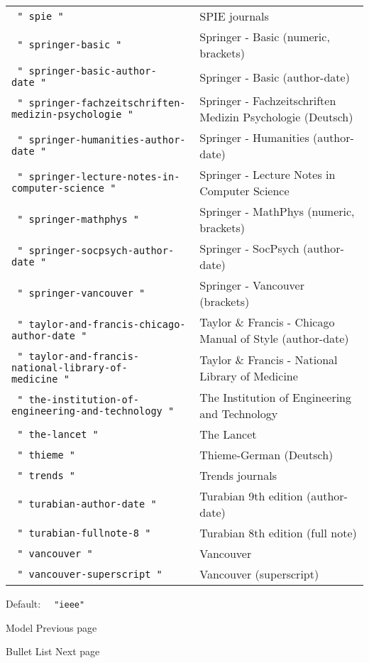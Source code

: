 \begin{longtable}[]{@{}ll@{}}
\texttt{\ "\ spie\ "\ } & SPIE journals \\
\texttt{\ "\ springer-basic\ "\ } & Springer - Basic (numeric,
brackets) \\
\texttt{\ "\ springer-basic-author-date\ "\ } & Springer - Basic
(author-date) \\
\texttt{\ "\ springer-fachzeitschriften-medizin-psychologie\ "\ } &
Springer - Fachzeitschriften Medizin Psychologie (Deutsch) \\
\texttt{\ "\ springer-humanities-author-date\ "\ } & Springer -
Humanities (author-date) \\
\texttt{\ "\ springer-lecture-notes-in-computer-science\ "\ } & Springer
- Lecture Notes in Computer Science \\
\texttt{\ "\ springer-mathphys\ "\ } & Springer - MathPhys (numeric,
brackets) \\
\texttt{\ "\ springer-socpsych-author-date\ "\ } & Springer - SocPsych
(author-date) \\
\texttt{\ "\ springer-vancouver\ "\ } & Springer - Vancouver
(brackets) \\
\texttt{\ "\ taylor-and-francis-chicago-author-date\ "\ } & Taylor \&
Francis - Chicago Manual of Style (author-date) \\
\texttt{\ "\ taylor-and-francis-national-library-of-medicine\ "\ } &
Taylor \& Francis - National Library of Medicine \\
\texttt{\ "\ the-institution-of-engineering-and-technology\ "\ } & The
Institution of Engineering and Technology \\
\texttt{\ "\ the-lancet\ "\ } & The Lancet \\
\texttt{\ "\ thieme\ "\ } & Thieme-German (Deutsch) \\
\texttt{\ "\ trends\ "\ } & Trends journals \\
\texttt{\ "\ turabian-author-date\ "\ } & Turabian 9th edition
(author-date) \\
\texttt{\ "\ turabian-fullnote-8\ "\ } & Turabian 8th edition (full
note) \\
\texttt{\ "\ vancouver\ "\ } & Vancouver \\
\texttt{\ "\ vancouver-superscript\ "\ } & Vancouver (superscript) \\
\end{longtable}

Default: \texttt{\ }{\texttt{\ "ieee"\ }}\texttt{\ }

\href{/docs/reference/model/}{\pandocbounded{}}

{ Model } { Previous page }

\href{/docs/reference/model/list/}{\pandocbounded{}}

{ Bullet List } { Next page }
